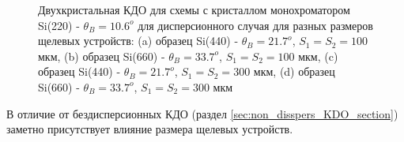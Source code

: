 \begin{figure}[H]
  \centering
  \hfill
  \hfill
  \hfill
  \caption{Двухкристальная КДО для схемы с кристаллом монохроматором Si(220) - $\theta_B = 10.6^o$ для дисперсионного случая для разных размеров щелевых устройств:
  (a) образец Si(440) - $\theta_B = 21.7^o$, $S_1 = S_2 = 100$ мкм, (b) образец Si(660) - $\theta_B = 33.7^o$, $S_1 = S_2 = 100$ мкм,
   (c) образец Si(440) - $\theta_B = 21.7^o$, $S_1 = S_2 = 300$ мкм, (d) образец Si(660) - $\theta_B = 33.7^o$, $S_1 = S_2 = 300$ мкм}
  \label{ris:disspersion_curves_expantheory}
\end{figure}

 В отличие от бездисперсионных КДО (раздел \ref{sec:non_disspers_KDO_section}) заметно присутствует
 влияние размера щелевых устройств.
